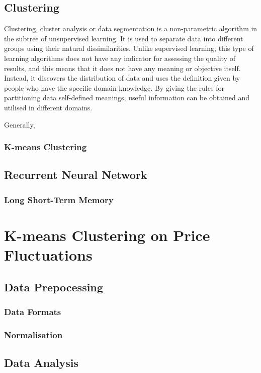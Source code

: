 \documentclass[11pt]{article} %
\theoremstyle{plain}
\theoremstyle{definition}
\begin{document}
\subsection{Clustering}

Clustering, cluster analysis or data segmentation is a non-parametric algorithm in the subtree of unsupervised learning. It is used to separate data into different groups using their natural dissimilarities. Unlike supervised learning, this type of learning algorithms does not have any indicator for assessing the quality of results, and this means that it does not have any meaning or objective itself. Instead, it discovers the distribution of data and uses the definition given by people who have the specific domain knowledge. By giving the rules for partitioning data self-defined meanings, useful information can be obtained and utilised in different domains\cite{hastie/etal:2009}.

Generally, 

\subsubsection{K-means Clustering}

\subsection{Recurrent Neural Network}
\subsubsection{Long Short-Term Memory}

\section{K-means Clustering on Price Fluctuations}
\subsection{Data Prepocessing}
\subsubsection{Data Formats}
\subsubsection{Normalisation}
\subsection{Data Analysis}
\end{document}

